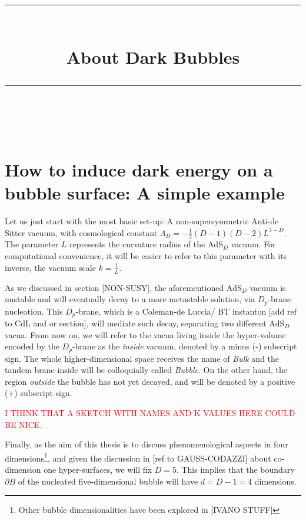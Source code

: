 \documentclass[12pt, a4paper]{article} %
\title{	
	\normalfont\normalsize
	\textsc{}\\ %
	\vspace{5pt} %
	\rule{\linewidth}{0.2pt}\\ %
	\vspace{10pt} %
	{\huge About Dark Bubbles}\\ %
	\vspace{5pt} %
	\rule{\linewidth}{-2pt}\\ %
	\vspace{-25pt} %
	\date{}
}
\author{}
\begin{document}
\maketitle 
\tableofcontents




\newpage
\section{How to induce dark energy on a bubble surface: A simple example}

Let us just start with the most basic set-up: A non-supersymmetric Anti-de Sitter vacuum, with cosmological constant $\Lambda_{D} = - \tfrac{1}{2}(D-1)(D-2)L^{3-D}$. The parameter $L$ represents the curvature radius of the $\text{AdS}_{D}$ vacuum. For computational convenience, it will be easier to refer to this parameter with its inverse, the vacuum scale $k = \tfrac{1}{L}$.

As we discussed in section [NON-SUSY], the aforementioned $\text{AdS}_{D}$ vacuum is unstable and will eventually decay to a more metastable solution, via $D_{p}$-brane nucleation. This $D_{p}$-brane, which is a Coleman-de Luccia/ BT instanton [add ref to CdL and or section], will mediate such decay, separating two different $\text{AdS}_{D}$ vacua. From now on, we will refer to the vacua living inside the hyper-volume encoded by the $D_{p}$-brane as the \textit{inside} vacuum, denoted by a minus (-) subscript sign. The whole higher-dimensional space receives the name of \textit{Bulk} and the tandem brane-inside will be colloquially called \textit{Bubble}. On the other hand, the region \textit{outside} the bubble has not yet decayed, and will be denoted by a positive (+) subscript sign.

\textcolor{red}{I THINK THAT A SKETCH WITH NAMES AND K VALUES HERE COULD BE NICE.}

Finally, as the aim of this thesis is to discuss phenomenological aspects in four dimensions\footnote{Other bubble dimensionalities have been explored in [IVANO STUFF]}, and given the discussion in [ref to GAUSS-CODAZZI] about co-dimension one hyper-surfaces, we will fix $D=5$. This implies that the boundary $\partial B$ of the nucleated five-dimensional bubble will have $d = D-1 = 4$ dimensions.
\end{document}

